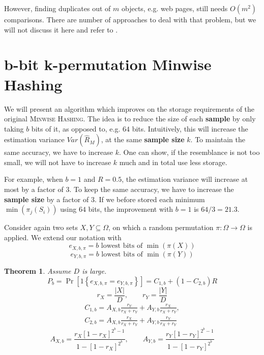 \documentclass[a4paper]{article}
\newtheorem{mytheorem}{Theorem}
\begin{document}
However, finding duplicates out of $m$ objects, e.g. web pages, still needs $O(m^2)$ comparisons. There are number of approaches to deal with that problem, but we will not discuss it here and refer to \citep{BroderGMZ97,STOC02*380}.


\section{b-bit k-permutation Minwise Hashing}\label{sec:b-bitMinwiseHashing}

We will present an algorithm which improves on the storage requirements of the original \textsc{Minwise Hashing}. The idea is to reduce the size of each \textbf{sample} by only taking $b$ bits of it, as opposed to, e.g. $64$ bits. Intuitively, this will increase the estimation variance $Var(\hat{R}_M)$, at the same \textbf{sample size} $k$. To maintain the same accuracy, we have to increase $k$. One can show, if the resemblance is not too small, we will not have to increase $k$ much and in total use less storage.

For example, when $b=1$ and $R=0.5$, the estimation variance will increase at most by a factor of $3$. To keep the same accuracy, we have to increase the \textbf{sample size} by a factor of $3$. If we before stored each minimum $\min(\pi_j(S_i))$ using $64$ bits, the improvement with $b=1$ is $64/3=21.3$.

Consider again two sets $X,Y \subseteq \Omega$, on which a random permutation $\pi: \Omega \longrightarrow \Omega$ is applied. We extend our notation with
\[
e_{X,b,\pi}=b \text{ lowest bits of } \min(\pi(X))
\]
\[
e_{Y,b,\pi}=b \text{ lowest bits of } \min(\pi(Y))
\]
\begin{framed}
\begin{mytheorem} \label{the:b-bitMinwiseHashing}
Assume $D$ is large.
\begin{equation}\label{eq:minwiseB-bit}
P_b=\Pr[1\left\lbrace e_{X,b,\pi}=e_{Y,b,\pi}\right\rbrace]=C_{1,b}+(1-C_{2,b})R
\end{equation}
\begin{equation}
r_X=\frac{|X|}{D}, \qquad r_Y=\frac{|Y|}{D}
\end{equation}
\begin{equation}
\begin{split}
C_{1,b}=A_{X,b}\frac{r_Y}{r_X+r_Y}+A_{Y,b}\frac{r_X}{r_X+r_Y},\\
C_{2,b}=A_{X,b}\frac{r_X}{r_X+r_Y}+A_{Y,b}\frac{r_Y}{r_X+r_Y}
\end{split}
\end{equation}
\begin{equation}
A_{X,b}=\frac{r_X[1-r_X]^{2^b-1}}{1-[1-r_X]^{2^b}}, \qquad A_{Y,b}=\frac{r_Y[1-r_Y]^{2^b-1}}{1-[1-r_Y]^{2^b}}
\end{equation}
\end{mytheorem}
\end{framed}
\end{document}
